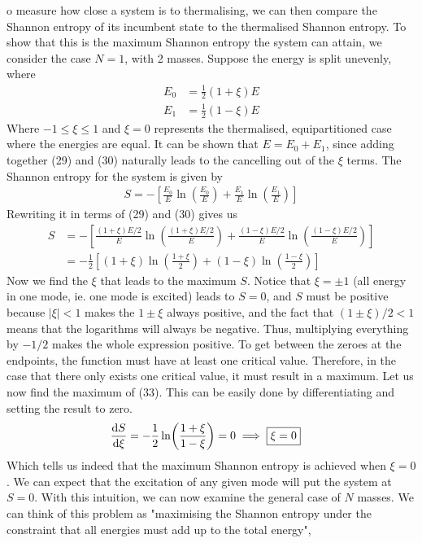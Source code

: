 \documentclass{article}
\begin{document}
o measure how close a system is to thermalising, we can then compare the Shannon entropy of its incumbent state 
to the thermalised Shannon entropy. To show that this is the maximum Shannon entropy the system can attain, 
we consider the case $N=1$, with 2 masses. Suppose the energy is split unevenly, where 
\begin{align}
    E_0&=\frac{1}{2}(1+\xi)E\\ 
    E_1&=\frac{1}{2}(1-\xi)E
\end{align}
Where $-1\leq\xi\leq1$ and $\xi=0$ represents the thermalised, equipartitioned case where the energies are equal.
It can be shown that $E=E_0+E_1$, since adding together (29) and (30) naturally leads to the cancelling out 
of the $\xi$ terms. The Shannon entropy for the system is given by
\begin{align}
    S=-[\frac{E_0}{E}\ln(\frac{E_0}{E})+\frac{E_1}{E}\ln(\frac{E_1}{E})]
\end{align}
Rewriting it in terms of (29) and (30) gives us 
\begin{align}
    S&=-[\frac{(1+\xi)E/2}{E}\ln(\frac{(1+\xi)E/2}{E})+\frac{(1-\xi)E/2}{E}\ln(\frac{(1-\xi)E/2}{E})]\\ 
    &=-\frac{1}{2}[(1+\xi)\ln(\frac{1+\xi}{2})+(1-\xi)\ln(\frac{1-\xi}{2})]
\end{align}
Now we find the $\xi$ that leads to the maximum $S$. Notice that $\xi=\pm1$ (all energy in one mode, ie. one mode is excited) leads to $S=0$, and $S$ must be 
positive because $|\xi|<1$ makes the $1\pm\xi$ always positive, and the fact that $(1\pm\xi)/2<1$ means that 
the logarithms will always be negative. Thus, multiplying everything by $-1/2$ makes the whole expression positive.
To get between the zeroes at the endpoints,
 the function must have at least one critical value. Therefore, in 
the case that there only exists one critical value, it must result in a maximum. Let us now find the 
maximum    of (33). This can be easily done by differentiating and setting the result to zero. 
\begin{align}
    \dv{S}{\xi}&=-\frac{1}{2}\ln(\frac{1+\xi}{1-\xi})=0 \implies \boxed{\xi=0}
\end{align}
Which tells us indeed that the maximum Shannon entropy is achieved when $\xi=0$. 
We can expect that the excitation of any given
 mode will put the system at $S=0$.
With this intuition, we can now 
examine the general case of $N$ masses. We can think of this problem as "maximising the Shannon entropy 
under the constraint that all energies must add up to the total energy",
\end{document}
